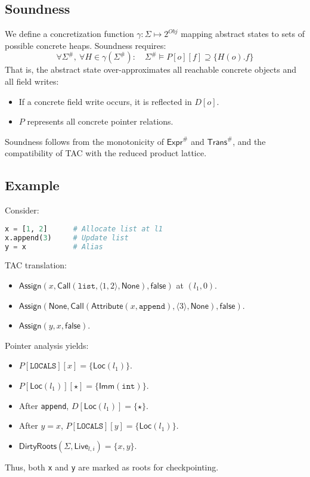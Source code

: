 \subsection{Soundness}

We define a concretization function $\gamma: \Sigma \mapsto 2^{Obj}$ mapping abstract states to sets of possible concrete heaps.  
Soundness requires:
\[
\forall \Sigma^\#,\ \forall H \in \gamma(\Sigma^\#):
    \quad \Sigma^\# \models P[o][f] \supseteq \{ H(o).f \}
\]
That is, the abstract state over-approximates all reachable concrete objects and all field writes:
\begin{itemize}
    \item If a concrete field write occurs, it is reflected in $D[o]$.
    \item $P$ represents all concrete pointer relations.
\end{itemize}
Soundness follows from the monotonicity of $\mathsf{Expr}^\#$ and $\mathsf{Trans}^\#$, and the compatibility of TAC with the reduced product lattice.

\subsection{Example}

Consider:
\begin{lstlisting}[language=python]
x = [1, 2]      # Allocate list at l1
x.append(3)     # Update list
y = x           # Alias
\end{lstlisting}

TAC translation:
\begin{itemize}
    \item $\mathsf{Assign}(x,\mathsf{Call}(\mathtt{list},\langle1,2\rangle,\mathsf{None}),\mathsf{false})$ at $(l_1,0)$.
    \item $\mathsf{Assign}(\mathsf{None},\mathsf{Call}(\mathsf{Attribute}(x,\mathtt{append}),\langle3\rangle,\mathsf{None}),\mathsf{false})$.
    \item $\mathsf{Assign}(y,x,\mathsf{false})$.
\end{itemize}

Pointer analysis yields:
\begin{itemize}
    \item $P[\mathtt{LOCALS}][x] = \{\mathsf{Loc}(l_1)\}$.
    \item $P[\mathsf{Loc}(l_1)][\star] = \{\mathsf{Imm}(\mathtt{int})\}$.
    \item After \texttt{append}, $D[\mathsf{Loc}(l_1)] = \{\star\}$.
    \item After $y = x$, $P[\mathtt{LOCALS}][y] = \{\mathsf{Loc}(l_1)\}$.
    \item $\mathsf{DirtyRoots}(\Sigma,\mathsf{Live}_{l,i}) = \{x,y\}$.
\end{itemize}
Thus, both \texttt{x} and \texttt{y} are marked as roots for checkpointing.
